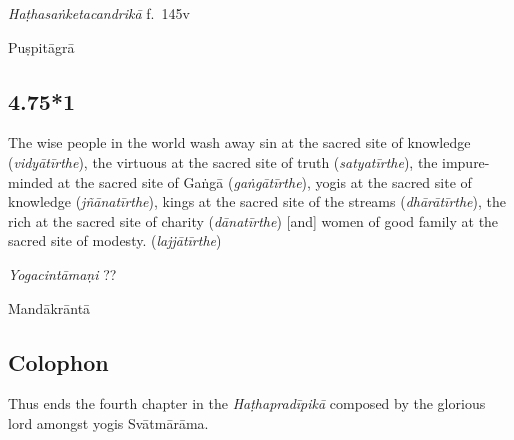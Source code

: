 \begin{ekdosis}

\begin{testimonia}[hp04_075]
\emph{Haṭhasaṅketacandrikā} f.~145v
\begin{versinnote}
\end{versinnote}
\end{testimonia}

\begin{philcomm}[hp04_075]
\end{philcomm}

\begin{metre}[hp04_075]
Puṣpitāgrā
\end{metre}

\subsection*{4.75*1}
\begin{translation}[hp04_75_1]
The wise people in the world wash away sin at the sacred site of knowledge (\emph{vidyātīrthe}), the virtuous at the sacred site of truth (\emph{satyatīrthe}), the impure-minded at the sacred site of Gaṅgā (\emph{gaṅgātīrthe}), yogis at the sacred site of knowledge (\emph{jñānatīrthe}), kings at the sacred site of the streams (\emph{dhārātīrthe}), the rich at the sacred site of charity (\emph{dānatīrthe}) [and] women of good family at the sacred site of modesty. (\emph{lajjātīrthe})
\end{translation}


\begin{testimonia}[hp04_75_1]
\emph{Yogacintāmaṇi} ??
\end{testimonia}


\begin{metre}[hp04_075_1]
Mandākrāntā 
\end{metre}

\subsection*{Colophon}
\begin{translation}[hp04_col]
Thus ends the fourth chapter in the \emph{Haṭhapradīpikā} composed by the glorious lord amongst yogis Svātmārāma.
\end{translation}

\end{ekdosis}

